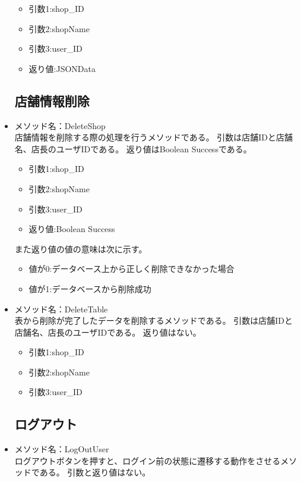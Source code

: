 \documentclass[a4j]{jarticle}
\begin{document}
\begin{itemize}
	\begin{itemize}
		\item 引数1:shop\_ID
		\item 引数2:shopName
		\item 引数3:user\_ID
		\item 返り値:JSONData
	\end{itemize}
\subsection{店舗情報削除}
%
\item メソッド名：DeleteShop\\

店舗情報を削除する際の処理を行うメソッドである。
引数は店舗IDと店舗名、店長のユーザIDである。
返り値はBoolean Successである。

	\begin{itemize}
		\item 引数1:shop\_ID
		\item 引数2:shopName
		\item 引数3:user\_ID
		\item 返り値:Boolean Success
	\end{itemize}
また返り値の値の意味は次に示す。
	\begin{itemize}
		\item 値が0:データベース上から正しく削除できなかった場合
		\item 値が1:データベースから削除成功
	\end{itemize}

\item メソッド名：DeleteTable\\

表から削除が完了したデータを削除するメソッドである。
引数は店舗IDと店舗名、店長のユーザIDである。
返り値はない。
	\begin{itemize}
		\item 引数1:shop\_ID
		\item 引数2:shopName
		\item 引数3:user\_ID
	\end{itemize}

\subsection{ログアウト}
%
\item メソッド名：LogOutUser\\
ログアウトボタンを押すと、ログイン前の状態に遷移する動作をさせるメソッドである。
引数と返り値はない。
%

\end{itemize}
\end{document}
